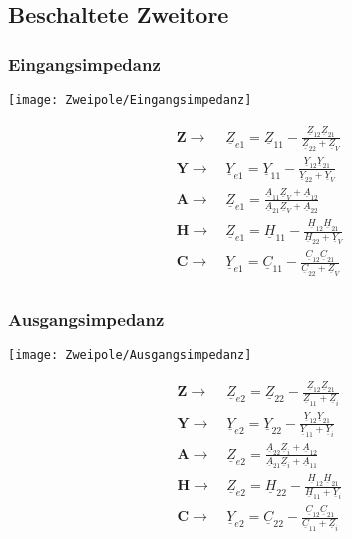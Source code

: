 \subsection{Beschaltete Zweitore}
\subsubsection{Eingangsimpedanz}
\centering\texttt{[image: Zweipole/Eingangsimpedanz]}
\begin{mdframed}[style=exercise]
    \begin{align*}
        \boldsymbol{Z}\rightarrow&\  \underline{Z}_{e1} = \underline{Z}_{11}-\frac{\underline{Z}_{12}\underline{Z}_{21}}{\underline{Z}_{22}+\underline{Z}_V}\\
        \boldsymbol{Y}\rightarrow&\  \underline{Y}_{e1} = \underline{Y}_{11}-\frac{\underline{Y}_{12}\underline{Y}_{21}}{\underline{Y}_{22}+\underline{Y}_V}\\
        \boldsymbol{A}\rightarrow&\  \underline{Z}_{e1} = \frac{\underline{A}_{11}\underline{Z}_V + \underline{A}_{12}}{\underline{A}_{21}\underline{Z}_V+\underline{A}_{22}}\\
        \boldsymbol{H}\rightarrow&\  \underline{Z}_{e1} = \underline{H}_{11}-\frac{\underline{H}_{12}\underline{H}_{21}}{\underline{H}_{22}+\underline{Y}_V}\\
        \boldsymbol{C}\rightarrow&\  \underline{Y}_{e1} = \underline{C}_{11}-\frac{\underline{C}_{12}\underline{C}_{21}}{\underline{C}_{22}+\underline{Z}_V}\\
    \end{align*}
\end{mdframed}
\raggedright

\subsubsection{Ausgangsimpedanz}
\centering\texttt{[image: Zweipole/Ausgangsimpedanz]}
\begin{mdframed}[style=exercise]
    \begin{align*}
        \boldsymbol{Z}\rightarrow&\  \underline{Z}_{e2} = \underline{Z}_{22}-\frac{\underline{Z}_{12}\underline{Z}_{21}}{\underline{Z}_{11}+\underline{Z}_i}\\
        \boldsymbol{Y}\rightarrow&\  \underline{Y}_{e2} = \underline{Y}_{22}-\frac{\underline{Y}_{12}\underline{Y}_{21}}{\underline{Y}_{11}+\underline{Y}_i}\\
        \boldsymbol{A}\rightarrow&\  \underline{Z}_{e2} = \frac{\underline{A}_{22}\underline{Z}_i + \underline{A}_{12}}{\underline{A}_{21}\underline{Z}_i+\underline{A}_{11}}\\
        \boldsymbol{H}\rightarrow&\  \underline{Z}_{e2} = \underline{H}_{22}-\frac{\underline{H}_{12}\underline{H}_{21}}{\underline{H}_{11}+\underline{Y}_i}\\
        \boldsymbol{C}\rightarrow&\  \underline{Y}_{e2} = \underline{C}_{22}-\frac{\underline{C}_{12}\underline{C}_{21}}{\underline{C}_{11}+\underline{Z}_i}\\
    \end{align*}
\end{mdframed}
\raggedright

